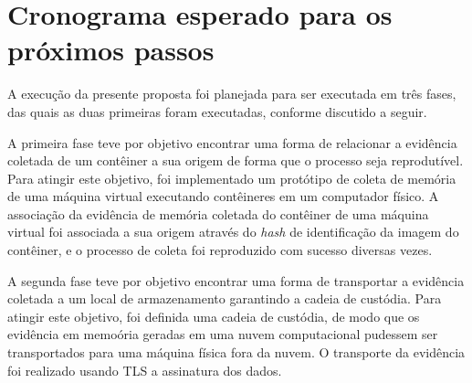 
%


\section{Cronograma esperado para os próximos passos}
\label{sec:proposta-prox}


A execução da presente proposta foi planejada para ser executada em três fases, das quais as duas primeiras foram executadas, conforme discutido a seguir.


A primeira fase teve por objetivo encontrar uma forma de relacionar a evidência coletada de um contêiner a sua origem de forma que o processo seja reprodutível. 
%
Para atingir este objetivo, foi implementado um protótipo de coleta de memória de uma máquina virtual executando contêineres em um computador físico. 
%
A associação da evidência de memória coletada do contêiner de uma máquina virtual foi associada a sua origem através do \textit{hash} de identificação da imagem do contêiner, e o processo de coleta foi reproduzido com sucesso diversas vezes.


A segunda fase teve por objetivo encontrar uma forma de transportar a evidência coletada a um local de armazenamento garantindo a cadeia de custódia.
%
Para atingir este objetivo, foi definida uma cadeia de custódia, de modo que os evidência em memoória geradas em uma nuvem computacional pudessem ser transportados para uma máquina física fora da nuvem.
%
O transporte da evidência foi realizado usando TLS a assinatura dos dados.


